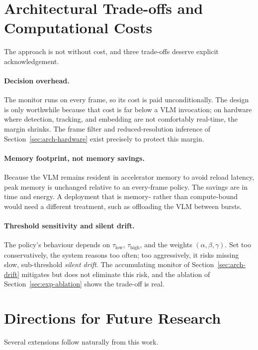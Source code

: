 \section{Architectural Trade-offs and Computational Costs}
\label{sec:concl-tradeoffs}

The approach is not without cost, and three trade-offs deserve explicit
acknowledgement.

\paragraph{Decision overhead.} The monitor runs on every frame, so its cost is
paid unconditionally. The design is only worthwhile because that cost is far
below a VLM invocation; on hardware where detection, tracking, and embedding
are not comfortably real-time, the margin shrinks. The frame filter and
reduced-resolution inference of Section~\ref{sec:arch-hardware} exist
precisely to protect this margin.

\paragraph{Memory footprint, not memory savings.} Because the VLM remains
resident in accelerator memory to avoid reload latency, peak memory is
unchanged relative to an every-frame policy. The savings are in time and
energy. A deployment that is memory- rather than compute-bound would need a
different treatment, such as offloading the VLM between bursts.

\paragraph{Threshold sensitivity and silent drift.} The policy's behaviour
depends on $\tau_{\text{low}}$, $\tau_{\text{high}}$, and the weights
$(\alpha,\beta,\gamma)$. Set too conservatively, the system reasons too
often; too aggressively, it risks missing slow, sub-threshold
\emph{silent drift}. The accumulating monitor of
Section~\ref{sec:arch-drift} mitigates but does not eliminate this risk, and
the ablation of Section~\ref{sec:exp-ablation} shows the trade-off is real.

\section{Directions for Future Research}
\label{sec:concl-future}

Several extensions follow naturally from this work.


